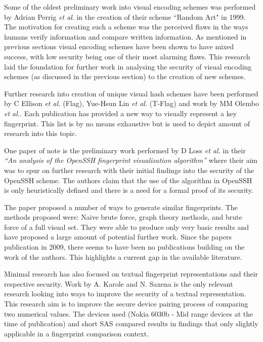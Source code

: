 Some of the oldest preliminary work into visual encoding schemes was performed by Adrian Perrig \textit{et al}\cite{perrig1999hash}. in the creation of their scheme ``Random Art" in 1999. The motivation for creating such a scheme was the perceived flaws in the ways humans verify information and compare written information. As mentioned in previous sections visual encoding schemes have been shown to have mixed success, with low security being one of their most alarming flaws. This research laid the foundation for further work in analysing the security of visual encoding schemes (as discussed in the previous section) to the creation of new schemes.

Further research into creation of unique visual hash schemes have been performed by C Ellison \textit{et al.} \cite{ellison2003public} (Flag), Yue-Hsun Lin \textit{et al.}\cite{lin2010spate} (T-Flag) and work by MM Olembo \textit{et al.}\cite{olembo2013developing}. Each publication has provided a new way to visually represent a key fingerprint. This list is by no means exhaustive but is used to depict amount of research into this topic.

One paper of note is the preliminary work performed by D Loss \textit{et al.}\cite{loss2009drunken} in their \textit{``An analysis of the OpenSSH fingerprint visualization algorithm''} where their aim was to spur on further research with their initial findings into the security of the OpenSSH scheme. The authors claim that the use of the algorithm in OpenSSH is only heuristically defined and there is a need for a formal proof of its security. 

The paper proposed a number of ways to generate similar fingerprints. The methods proposed were: Naive brute force, graph theory methods, and brute force of a full visual set. They were able to produce only very basic results and have proposed a large amount of potential further work. Since the papers publication in 2009, there seems to have been no publications building on the work of the authors. This highlights a current gap in the available literature.

Minimal research has also focused on textual fingerprint representations and their respective security. Work by A. Karole and N. Saxena\cite{karole2009improving} is the only relevant research looking into ways to improve the security of a textual representation. This research aim is to improve the secure device pairing process of comparing two numerical values. The devices used (Nokia 6030b - Mid range devices at the time of publication) and short SAS compared results in findings that only slightly applicable in a fingerprint comparison context. 

